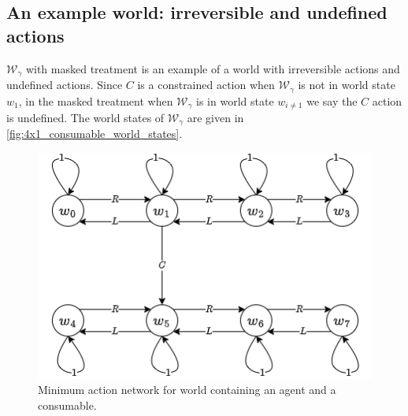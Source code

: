 
\subsection{An example world: irreversible and undefined actions}

$\mathscr{W}_{\gamma}$ with masked treatment is an example of a world with irreversible actions and undefined actions.
Since $C$ is a constrained action when $\mathscr{W}_{\gamma}$ is not in world state $w_{1}$, in the masked treatment when $\mathscr{W}_{\gamma}$ is in world state $w_{i \neq 1}$ we say the $C$ action is undefined.
The world states of $\mathscr{W}_{\gamma}$ are given in \cref{fig:4x1_consumable_world_states}.

\begin{figure}[H]
    \centering
    \includegraphics[width=\linewidth]{5BeyondSBDRLGlobalAlgebras/Images/min_actions_world_with_consumable_masked.png}
    \caption{
    Minimum action network for world containing an agent and a consumable.
    }
\end{figure}

